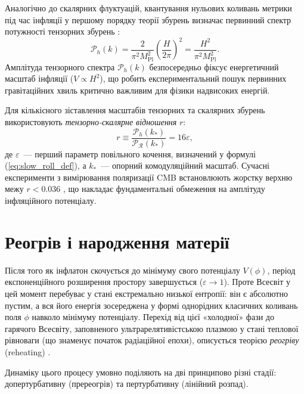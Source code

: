 \documentclass[12pt, a4paper]{article}
\begin{document}
Аналогічно до скалярних флуктуацій, квантування нульових коливань метрики під час інфляції у першому порядку теорії збурень визначає первинний спектр потужності тензорних збурень \cite{starobinsky_1979}:
\begin{equation}\label{eq:tensor_power_spec}
  \mathcal{P}_h(k) = \frac{2}{\pi^2 M_\mathrm{Pl}^2} \left(\frac{H}{2\pi}\right)^2 = \frac{H^2}{\pi^2 M_\mathrm{Pl}^2}.
\end{equation}
Амплітуда тензорного спектра $\mathcal{P}_h(k)$ безпосередньо фіксує енергетичний масштаб інфляції ($V \propto H^2$), що робить експериментальний пошук первинних гравітаційних хвиль критично важливим для фізики надвисоких енергій.

Для кількісного зіставлення масштабів тензорних та скалярних збурень використовують \emph{тензорно-скалярне відношення} $r$:
\begin{equation}\label{eq:tensor_scalar_ratio}
  r \equiv \frac{\mathcal{P}_h(k_*)}{\mathcal{P}_{\mathcal{R}}(k_*)} = 16\varepsilon,
\end{equation}
де $\varepsilon$~--- перший параметр повільного кочення, визначений у формулі (\ref{eq:slow_roll_def}), а $k_*$~--- опорний комодуляційний масштаб. Сучасні експерименти з вимірювання поляризації CMB встановлюють жорстку верхню межу $r < 0.036$ \cite{bicep_keck_2021}, що накладає фундаментальні обмеження на амплітуду інфляційного потенціалу.


\section{Реогрів і народження матерії}

Після того як інфлатон скочується до мінімуму свого потенціалу $V(\phi)$, період експоненційного розширення простору завершується ($\varepsilon \to 1$). Проте Всесвіт у цей момент перебуває у стані екстремально низької ентропії: він є абсолютно пустим, а вся його енергія зосереджена у формі однорідних класичних коливань поля $\phi$ навколо мінімуму потенціалу. Перехід від цієї «холодної» фази до гарячого Всесвіту, заповненого ультрарелятивістською плазмою у стані теплової рівноваги (що знаменує початок радіаційної епохи), описується теорією \emph{реогріву} (reheating) \cite{linde_1982, albrecht_1982}.

Динаміку цього процесу умовно поділяють на дві принципово різні стадії: допертурбативну (пререогрів) та пертурбативну (лінійний розпад).
\end{document}
